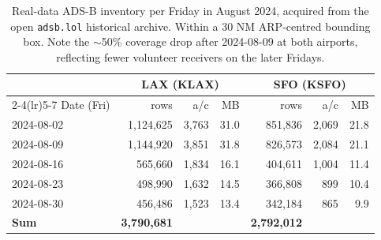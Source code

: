 \begin{table}[t]
\centering
\caption{Real-data ADS-B inventory per Friday in August 2024, acquired from the open \texttt{adsb.lol} historical archive. Within a 30 NM ARP-centred bounding box. Note the $\sim$50\% coverage drop after 2024-08-09 at both airports, reflecting fewer volunteer receivers on the later Fridays.}
\label{tab:data}
\begin{tabular}{lrrrrrr}
\toprule
 & \multicolumn{3}{c}{LAX (KLAX)} & \multicolumn{3}{c}{SFO (KSFO)} \\
\cmidrule(lr){2-4}\cmidrule(lr){5-7}
Date (Fri) & rows & a/c & MB & rows & a/c & MB \\
\midrule
2024-08-02 & 1,124,625 & 3,763 & 31.0 & 851,836 & 2,069 & 21.8 \\
2024-08-09 & 1,144,920 & 3,851 & 31.8 & 826,573 & 2,084 & 21.1 \\
2024-08-16 & 565,660 & 1,834 & 16.1 & 404,611 & 1,004 & 11.4 \\
2024-08-23 & 498,990 & 1,632 & 14.5 & 366,808 & 899 & 10.4 \\
2024-08-30 & 456,486 & 1,523 & 13.4 & 342,184 & 865 & 9.9 \\
\midrule
\textbf{Sum} & \textbf{3,790,681} & & & \textbf{2,792,012} & & \\
\bottomrule
\end{tabular}
\end{table}
